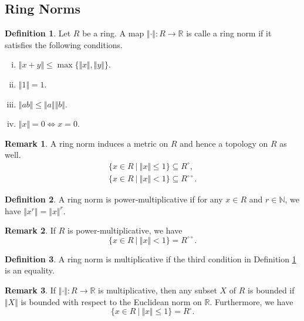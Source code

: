 \documentclass[10pt]{article}
\numberwithin{equation}{section}
\theoremstyle{definition}
\newtheorem{definition}{Definition}[subsection]
\newtheorem{remark}{Remark}[subsection]
\newcommand{\norm}[1]{\Vert #1 \Vert}
\newcommand{\N}[0]{\mathbb{N}}
\newcommand{\R}[0]{\mathbb{R}}
\newcommand{\sep}[0]{\:|\:}
\newcommand{\dcirc}[0]{{\circ\circ}}
\begin{document}
\subsection{Ring Norms}
\begin{definition}
    Let $R$ be a ring. A map $\norm{\cdot}:R\to \R$ is calle a ring norm if it satisfies the following conditions.
    \begin{enumerate}[i.]
        \item $\norm{x+y}\leq \max\{\norm{x},\norm{y}\}$.
        \item $\norm{1} = 1$.
        \item $\norm{ab}\leq \norm{a}\norm{b}$.
        \item $\norm{x} = 0\iff x=0$.
    \end{enumerate}
    \label{definition_28_2}
\end{definition}
\begin{remark}
    A ring norm induces a metric on $R$ and hence a topology on $R$ as well.
    \begin{align*}
        \{x\in R\sep \norm{x}\leq 1\}\subseteq R^\circ,\\
        \{x\in R\sep \norm{x}<1\}\subseteq R^\dcirc.
    \end{align*}
\end{remark}
\begin{definition}
    A ring norm is power-multiplicative if for any $x\in R$ and $r\in \N$, we have $\norm{x^r}=\norm{x}^r$.
\end{definition}
\begin{remark}
    If $R$ is power-multiplicative, we have
    \begin{equation*}
        \{x\in R\sep \norm{x}<1\}= R^\dcirc.
    \end{equation*}
\end{remark}
\begin{definition}
    A ring norm is multiplicative if the third condition in Definition \ref{definition_28_2} is an equality.
\end{definition}

\begin{remark}
    If $\norm{\cdot}:R\to \R$ is multiplicative, then any subset $X$ of $R$ is bounded if $\norm{X}$ is bounded with respect to the Euclidean norm on $\R$. Furthermore, we have 
    \begin{equation*}
        \{x\in R\sep \norm{x}\leq1\}= R^\circ.
    \end{equation*}
\end{remark}
\end{document}
